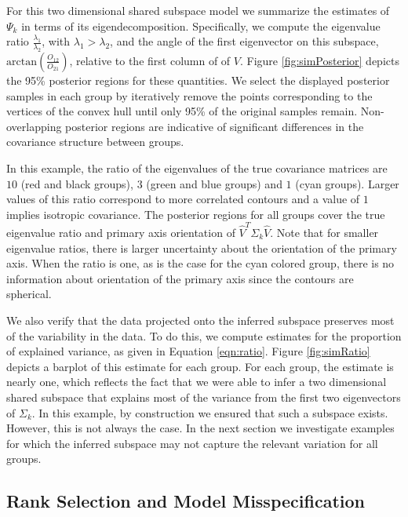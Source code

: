 \documentclass[12pt]{article}
\begin{document}
For this two dimensional shared subspace model we summarize the
estimates of $\Psi_k$ in terms of its eigendecomposition.
Specifically, we compute the eigenvalue ratio
$\frac{\lambda_1}{\lambda_2}$, with $\lambda_1 > \lambda_2$, and the
angle of the first eigenvector on this subspace,
$\text{arctan}(\frac{O_{12}}{O_{21}})$, relative to the first column
of of $V$.  Figure \ref{fig:simPosterior} depicts the 95\% posterior
regions for these quantities.  We select the displayed posterior
samples in each group by iteratively remove the points corresponding
to the vertices of the convex hull until only 95\% of the original
samples remain.  Non-overlapping posterior regions are indicative of
significant differences in the covariance structure between groups.

In this example, the ratio of the eigenvalues of the true covariance
matrices are $10$ (red and black groups), $3$ (green and blue
groups) and $1$ (cyan groups).  Larger values of this ratio
correspond to more correlated contours and a value of $1$ implies
isotropic covariance.  The posterior regions for all groups cover the
true eigenvalue ratio and primary axis orientation of $\hat{V}^T\Sigma_k\hat{V}$.
Note that for smaller eigenvalue ratios, there is larger uncertainty
about the orientation of the primary axis.  When the ratio is one, as
is the case for the cyan colored group, there is no information
about orientation of the primary axis since the contours are
spherical.

We also verify that the data projected onto the inferred subspace
preserves most of the variability in the data.  To do this, we compute
estimates for the proportion of explained variance, as given in
Equation \ref{eqn:ratio}.  Figure \ref{fig:simRatio} depicts a barplot
of this estimate for each group.  For each group, the estimate is
nearly one, which reflects the fact that we were able to infer a two
dimensional shared subspace that explains most of the variance from
the first two eigenvectors of $\Sigma_k$.  In this example, by
construction we ensured that such a subspace exists. However, this is
not always the case.  In the next section we investigate examples for
which the inferred subspace may not capture the relevant variation for
all groups.

\subsection{Rank Selection and Model Misspecification}
\end{document}
